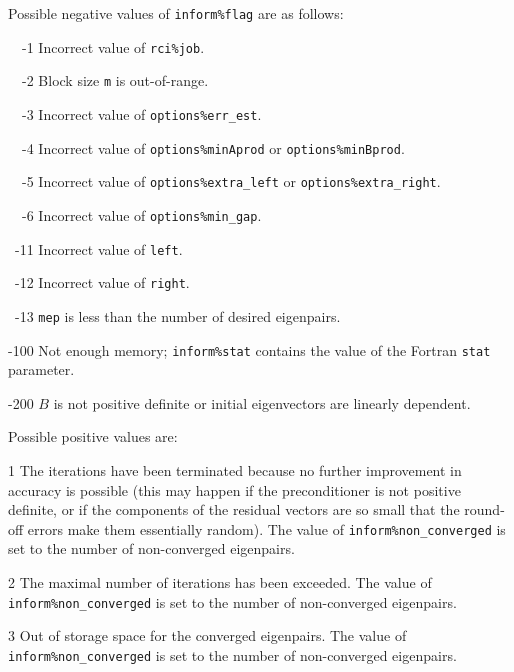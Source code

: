 Possible negative values of {\tt inform\%flag}
are as follows:
%
\begin{description}
%
\item{~~-1}
\hskip 9pt
Incorrect value of {\tt rci\%job}.
%
\item{~~-2}
\hskip 9pt
Block size {\tt m} is out-of-range.
%
\item{~~-3}
\hskip 9pt
Incorrect value of 
{\tt options\%err\_est}. %
%
\item{~~-4}
\hskip 9pt
Incorrect value of 
{\tt options\%minAprod} or {\tt options\%minBprod}.
%
\item{~~-5}
\hskip 9pt
Incorrect value of 
{\tt options\%extra\_left} or
{\tt options\%extra\_right}.
%
\item{~~-6}
\hskip 9pt
Incorrect value of 
{\tt options\%min\_gap}. %
%
\item{~-11}
\hskip 7pt
Incorrect value of 
{\tt left}. %
%
\item{~-12}
\hskip 7pt
Incorrect value of 
{\tt right}. %
%
\item{~-13}
\hskip 7pt
{\tt mep} is less than 
the number of desired eigenpairs.
%
\item{-100}
\hskip 4pt
Not enough memory;
{\tt inform\%stat} contains the value of the Fortran {\tt stat} parameter.
%
\item{-200}
\hskip 4pt
$B$ is not positive definite or initial eigenvectors are linearly dependent.
%
\end{description}

Possible positive values  are: 
%
\begin{description}
\item{1}
\hskip 9pt
The iterations have been terminated because no further improvement
in accuracy is possible (this may happen if the preconditioner is
not positive definite, or if the components of the residual vectors
are so small that the round-off
errors make them essentially random).
The value of {\tt inform\%non\_converged} is set to the number
of non-converged eigenpairs.
\item{2}
\hskip 9pt
The maximal number of iterations has been exceeded.
The value of {\tt inform\%non\_converged} is set to the number
of non-converged eigenpairs.
\item{3}
\hskip 9pt
Out of storage space for the converged eigenpairs.
The value of {\tt inform\%non\_converged} is set to the number
of non-converged eigenpairs.
%
\end{description}

